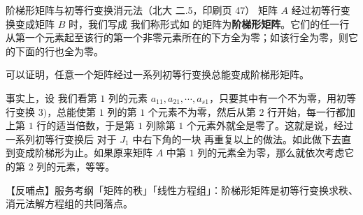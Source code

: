 \begin{fdeep}{阶梯形矩阵与初等行变换消元法（北大 二.5，印刷页 47）}
矩阵 $A$ 经过初等行变换变成矩阵 $B$ 时，我们写成
我们称形式如
的矩阵为\textbf{阶梯形矩阵}。它们的任一行从第一个元素起至该行的第一个非零元素所在的下方全为零；如该行全为零，则它的下面的行也全为零。

可以证明，任意一个矩阵经过一系列初等行变换总能变成阶梯形矩阵。

事实上，设
我们看第 $1$ 列的元素 $a_{11},a_{21},\cdots,a_{s1}$，只要其中有一个不为零，用初等行变换 $3)$，总能使第 $1$ 列的第 $1$ 个元素不为零，然后从第 $2$ 行开始，每一行都加上第 $1$ 行的适当倍数，于是第 $1$ 列除第 $1$ 个元素外就全是零了。这就是说，经过一系列初等行变换后
对于 $J_1$ 中右下角的一块
再重复以上的做法。如此做下去直到变成阶梯形为止。如果原来矩阵 $A$ 中第 $1$ 列的元素全为零，那么就依次考虑它的第 $2$ 列的元素，等等。

【反哺点】服务考纲「矩阵的秩」「线性方程组」：阶梯形矩阵是初等行变换求秩、消元法解方程组的共同落点。
\end{fdeep}

